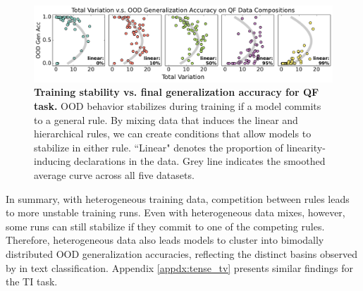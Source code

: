\begin{figure}[t!]
    \centering
    \includegraphics[width=1.0\linewidth]{figures/intra_inter_inconsistency_D270.pdf}
    \caption{\textbf{Training stability vs. final generalization accuracy for QF task.} OOD behavior stabilizes during training if a model commits to a general rule. By mixing data that induces the linear and hierarchical rules, we can create conditions that allow models to stabilize in either rule. ``Linear" denotes the proportion of linearity-inducing declarations in the data. 
    Grey line indicates the smoothed average curve across all five datasets.
    }
    \label{fig:intra_inter_variance}
\end{figure}

In summary, with heterogeneous training data, competition between rules leads to more unstable training runs. Even with heterogeneous data mixes, however, some runs can still stabilize if they  commit to one of the competing rules. Therefore, heterogeneous data also leads models to cluster into bimodally distributed OOD generalization accuracies, reflecting the distinct basins observed by \citet{Juneja2022-hj} in text classification.
Appendix \ref{appdx:tense_tv} presents similar findings for the TI task.

